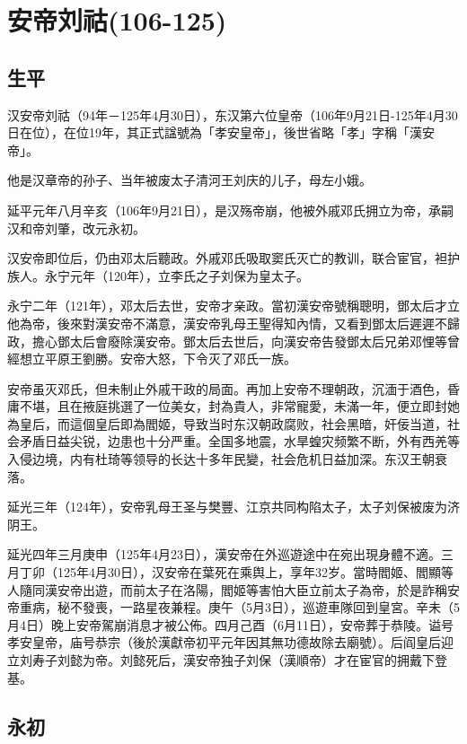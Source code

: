 
\section{安帝刘祜\tiny(106-125)}

\subsection{生平}

汉安帝刘祜（94年－125年4月30日），东汉第六位皇帝（106年9月21日-125年4月30日在位），在位19年，其正式諡號為「孝安皇帝」，後世省略「孝」字稱「漢安帝」。

他是汉章帝的孙子、当年被废太子清河王刘庆的儿子，母左小娥。

延平元年八月辛亥（106年9月21日），是汉殇帝崩，他被外戚邓氏拥立为帝，承嗣汉和帝刘肇，改元永初。

汉安帝即位后，仍由邓太后聽政。外戚邓氏吸取窦氏灭亡的教训，联合宦官，袒护族人。永宁元年（120年），立李氏之子刘保为皇太子。

永宁二年（121年），邓太后去世，安帝才亲政。當初漢安帝號稱聰明，鄧太后才立他為帝，後來對漢安帝不滿意，漢安帝乳母王聖得知內情，又看到鄧太后遲遲不歸政，擔心鄧太后會廢除漢安帝。鄧太后去世后，向漢安帝告發鄧太后兄弟邓悝等曾經想立平原王劉勝。安帝大怒，下令灭了邓氏一族。

安帝虽灭邓氏，但未制止外戚干政的局面。再加上安帝不理朝政，沉湎于酒色，昏庸不堪，且在掖庭挑選了一位美女，封為貴人，非常寵愛，未滿一年，便立即封她為皇后，而這個皇后即為閻姬，导致当时东汉朝政腐败，社会黑暗，奸佞当道，社会矛盾日益尖锐，边患也十分严重。全国多地震，水旱蝗灾频繁不断，外有西羌等入侵边境，内有杜琦等领导的长达十多年民變，社会危机日益加深。东汉王朝衰落。

延光三年（124年），安帝乳母王圣与樊豐、江京共同构陷太子，太子刘保被废为济阴王。

延光四年三月庚申（125年4月23日），漢安帝在外巡遊途中在宛出現身體不適。三月丁卯（125年4月30日），汉安帝在葉死在乘舆上，享年32岁。當時閻姬、閻顯等人隨同漢安帝出遊，而前太子在洛陽，閻姬等害怕大臣立前太子為帝，於是詐稱安帝重病，秘不發喪，一路星夜兼程。庚午（5月3日），巡遊車隊回到皇宮。辛未（5月4日）晚上安帝駕崩消息才被公佈。四月己酉（6月11日），安帝葬于恭陵。谥号孝安皇帝，庙号恭宗（後於漢獻帝初平元年因其無功德故除去廟號）。后阎皇后迎立刘寿子刘懿为帝。刘懿死后，漢安帝独子刘保（漢順帝）才在宦官的拥戴下登基。

\subsection{永初}

